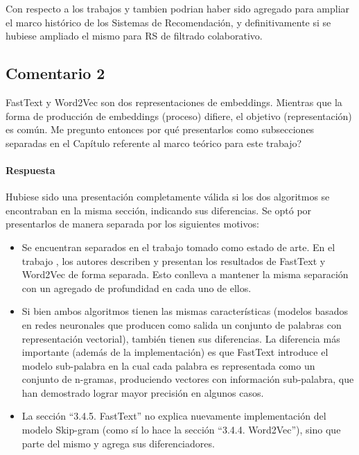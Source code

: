 \bigskip

Con respecto a los trabajos \citep{hill1995recommending} y \citep{resnick1994grouplens} tambien podrian haber sido agregado para ampliar el marco histórico de los Sistemas de Recomendación, y definitivamente si se hubiese ampliado el mismo para RS de filtrado colaborativo.

\subsection*{Comentario 2}
FastText y Word2Vec son dos representaciones de embeddings. Mientras que la forma de producción de embeddings (proceso) difiere, el objetivo (representación) es común. Me pregunto entonces por qué presentarlos como subsecciones separadas en el Capítulo referente al marco teórico para este trabajo?

\paragraph*{Respuesta}
Hubiese sido una presentación completamente válida si los dos algoritmos se encontraban en la misma sección, indicando sus diferencias. Se optó por presentarlos de manera separada por los siguientes motivos:
\begin{itemize}
	\item Se encuentran separados en el trabajo tomado como estado de arte. En el trabajo \citep{gonzalez2017comparative}, los autores describen y presentan los resultados de FastText y Word2Vec de forma separada. Esto conlleva a mantener la misma separación con un agregado de profundidad en cada uno de ellos.
	\item Si bien ambos algoritmos tienen las mismas características (modelos basados en redes neuronales que producen como salida un conjunto de palabras con representación vectorial), también tienen sus diferencias. La diferencia más importante (además de la implementación) es que FastText introduce el modelo sub-palabra en la cual cada palabra es representada como un conjunto de n-gramas, produciendo vectores con información sub-palabra, que han demostrado lograr mayor precisión en algunos casos.
	\item La sección “3.4.5. FastText” no explica nuevamente implementación del modelo Skip-gram (como sí lo hace la sección ``3.4.4. Word2Vec''), sino que parte del mismo y agrega sus diferenciadores.
\end{itemize}

